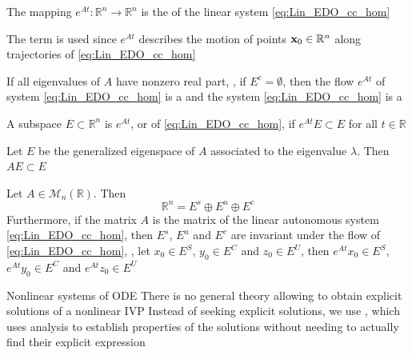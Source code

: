 \documentclass[aspectratio=169]{beamer}
\begin{document}
\begin{frame}
\begin{definition}
The mapping $e^{At}:\mathbb{R}^n\to\mathbb{R}^n$ is the  of the linear system \eqref{eq:Lin_EDO_cc_hom}
\end{definition}
The term  is used since $e^{At}$ describes the motion of points $\mathbf{x}_0\in\mathbb{R}^n$ along trajectories of \eqref{eq:Lin_EDO_cc_hom}
\vfill
\begin{definition}
If all eigenvalues of $A$ have nonzero real part, \ie, if $E^c=\emptyset$, then the flow $e^{At}$ of system \eqref{eq:Lin_EDO_cc_hom} is a  and the system \eqref{eq:Lin_EDO_cc_hom} is a 
\end{definition}
\vfill
\begin{definition}
A subspace $E\subset\mathbb{R}^n$ is  $e^{At}$, or  of \eqref{eq:Lin_EDO_cc_hom}, if $e^{At}E\subset E$ for all $t\in\mathbb{R}$
\end{definition}
\end{frame}

\begin{frame}
\begin{theorem}
Let $E$ be the generalized eigenspace of $A$ associated to the eigenvalue $\lambda$. Then $AE\subset E$
\end{theorem}
\vfill
\begin{theorem}
Let $A\in\mathcal{M}_n(\mathbb{R})$. Then
\[
\mathbb{R}^n=E^s\oplus E^u\oplus E^c
\]
Furthermore, if the matrix $A$ is the matrix of the linear autonomous system \eqref{eq:Lin_EDO_cc_hom}, then $E^s$, $E^u$ and $E^c$ are invariant under the flow of \eqref{eq:Lin_EDO_cc_hom}, \ie, let
$x_0\in E^S$, $y_0\in E^C$ and $z_0\in E^U$, then $e^{At}x_0\in E^S$,
$e^{At}y_0\in E^C$ and $e^{At}z_0\in E^U$
\end{theorem}
\end{frame}



\begin{frame}{Nonlinear systems of ODE}
There is no general theory allowing to obtain explicit solutions of a nonlinear IVP
\vfill
Instead of seeking explicit solutions, we use , which uses analysis to establish properties of the solutions without needing to actually find their explicit expression
\end{frame}
\end{document}
